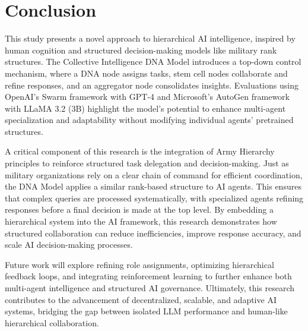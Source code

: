 \section{Conclusion}
\label{sec:conclusion}
This study presents a novel approach to hierarchical AI intelligence, inspired by human cognition and structured decision-making models like military rank structures. The Collective Intelligence DNA Model introduces a top-down control mechanism, where a DNA node assigns tasks, stem cell nodes collaborate and refine responses, and an aggregator node consolidates insights. Evaluations using OpenAI’s Swarm framework with GPT-4 and Microsoft’s AutoGen framework with LLaMA 3.2 (3B) highlight the model’s potential to enhance multi-agent specialization and adaptability without modifying individual agents’ pretrained structures.

A critical component of this research is the integration of Army Hierarchy principles to reinforce structured task delegation and decision-making. Just as military organizations rely on a clear chain of command for efficient coordination, the DNA Model applies a similar rank-based structure to AI agents. This ensures that complex queries are processed systematically, with specialized agents refining responses before a final decision is made at the top level. By embedding a hierarchical system into the AI framework, this research demonstrates how structured collaboration can reduce inefficiencies, improve response accuracy, and scale AI decision-making processes.

Future work will explore refining role assignments, optimizing hierarchical feedback loops, and integrating reinforcement learning to further enhance both multi-agent intelligence and structured AI governance. Ultimately, this research contributes to the advancement of decentralized, scalable, and adaptive AI systems, bridging the gap between isolated LLM performance and human-like hierarchical collaboration.
